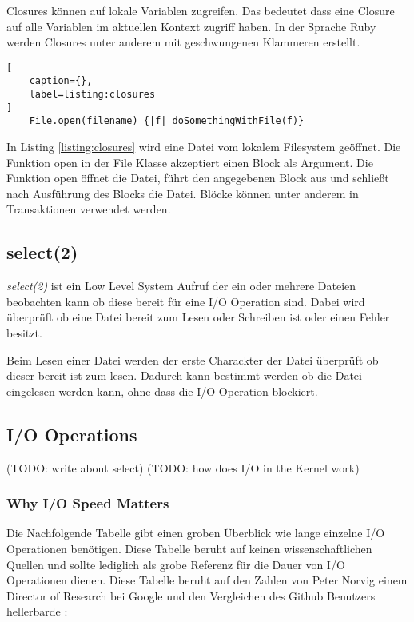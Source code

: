 Closures können auf lokale Variablen zugreifen. Das bedeutet dass eine Closure auf alle Variablen im aktuellen Kontext zugriff haben. In der Sprache Ruby werden Closures unter anderem mit geschwungenen Klammeren erstellt. \cite[]{fow04}

\begin{lstlisting}[
	caption={},
	label=listing:closures
]
	File.open(filename) {|f| doSomethingWithFile(f)}
\end{lstlisting}
\cite[]{fow04}

In Listing \ref{listing:closures} wird eine Datei vom lokalem Filesystem geöffnet. Die Funktion open in der File Klasse akzeptiert einen Block als Argument. Die Funktion open öffnet die Datei, führt den angegebenen Block aus und schließt nach Ausführung des Blocks die Datei. Blöcke können unter anderem in Transaktionen verwendet werden. \cite[]{fow04}


\subsection{select(2)}
\emph{select(2)} ist ein Low Level System Aufruf der ein oder mehrere Dateien beobachten kann ob diese bereit für eine I/O Operation sind. Dabei wird überprüft ob eine Datei bereit zum Lesen oder Schreiben ist oder einen Fehler besitzt.


Beim Lesen einer Datei werden der erste Charackter der Datei überprüft ob dieser bereit ist zum lesen. Dadurch kann bestimmt werden ob die Datei eingelesen werden kann, ohne dass die I/O Operation blockiert.





\cite[]{select2}

\subsection{I/O Operations}
\label{subsection: io_operationen}

(TODO: write about select)
(TODO: how does I/O in the Kernel work)


\subsubsection{Why I/O Speed Matters}
\label{subsection: i/o speed}
Die Nachfolgende Tabelle gibt einen groben Überblick wie lange einzelne I/O Operationen benötigen. Diese Tabelle beruht auf keinen wissenschaftlichen Quellen und sollte lediglich als grobe Referenz für die Dauer von I/O Operationen dienen. Diese Tabelle beruht auf den Zahlen von Peter Norvig \cite[]{Nor98} einem Director of Research bei Google und den Vergleichen des Github Benutzers hellerbarde \cite[]{Gis15}:

